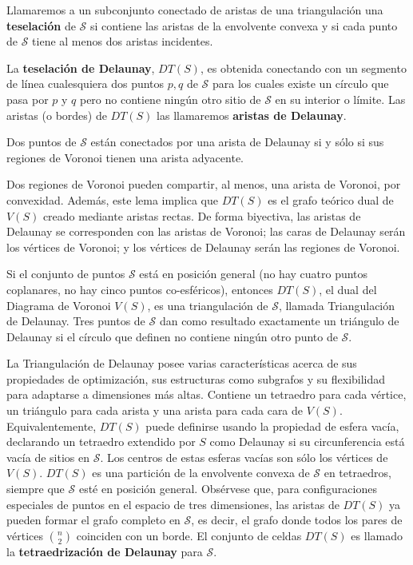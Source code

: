 Llamaremos a un subconjunto conectado de aristas de una triangulación una \textbf{teselación} de $\mathcal{S}$ si contiene las aristas de la envolvente convexa y si cada punto de $\mathcal{S}$ tiene al menos dos aristas incidentes.

La \textbf{teselación de Delaunay}, $DT(S)$, es obtenida conectando con un segmento de línea cualesquiera dos puntos $p, q$ de $\mathcal{S}$ para los cuales existe un círculo que pasa por $p$ y $q$ pero no contiene ningún otro sitio de $\mathcal{S}$ en su interior o límite. Las aristas (o bordes) de $DT(S)$ las llamaremos \textbf{aristas de Delaunay}.

\begin{lema}
	Dos puntos de $\mathcal{S}$ están conectados por una arista de Delaunay si y sólo si sus regiones de Voronoi tienen una arista adyacente.
\end{lema}

Dos regiones de Voronoi pueden compartir, al menos, una arista de Voronoi, por convexidad. Además, este lema implica que $DT(S)$ es el grafo teórico dual de $V(S)$ creado mediante aristas rectas. De forma biyectiva, las aristas de Delaunay se corresponden con las aristas de Voronoi; las caras de Delaunay serán los vértices de Voronoi; y los vértices de Delaunay serán las regiones de Voronoi.

\begin{teorema}\label{th31}
    Si el conjunto de puntos $\mathcal{S}$ está en posición general (no hay cuatro puntos coplanares, no hay cinco puntos co-esféricos), entonces $DT(S)$, el dual del Diagrama de Voronoi $V(S)$, es una triangulación de $\mathcal{S}$, llamada Triangulación de Delaunay. Tres puntos de $\mathcal{S}$ dan como resultado exactamente un triángulo de Delaunay si el círculo que definen no contiene ningún otro punto de $\mathcal{S}$.
\end{teorema}

La Triangulación de Delaunay posee varias características acerca de sus propiedades de optimización, sus estructuras como subgrafos y su flexibilidad para adaptarse a dimensiones más altas. Contiene un tetraedro para cada vértice, un triángulo para cada arista y una arista para cada cara de $V(S)$. Equivalentemente, $DT(S)$ puede definirse usando la propiedad de esfera vacía, declarando un tetraedro extendido por $S$ como Delaunay si su circunferencia está vacía de sitios en $\mathcal{S}$. Los centros de estas esferas vacías son sólo los vértices de $V(S)$.
$DT(S)$ es una partición de la envolvente convexa de $\mathcal{S}$ en tetraedros, siempre que $\mathcal{S}$ esté en posición general. Obsérvese que, para configuraciones especiales de puntos en el espacio de tres dimensiones, las aristas de $DT(S)$ ya pueden formar el grafo completo en $\mathcal{S}$, es decir, el grafo donde todos los pares de vértices ${n \choose 2}$ coinciden con un borde. El conjunto de celdas $DT(S)$ es llamado la \textbf{tetraedrización de Delaunay} para $\mathcal{S}$.

